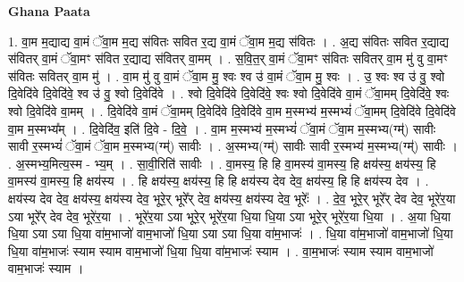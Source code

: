 \documentclass[17pt]{extarticle}
\begin{document}
\textbf{Ghana Paata } \newline

1. वा॒म म॒द्याद्य वा॒मं ॅवा॒म म॒द्य स॑वितः सवित र॒द्य वा॒मं ॅवा॒म म॒द्य स॑वितः । . अ॒द्य स॑वितः सवित र॒द्याद्य स॑वितर् वा॒मं ॅवा॒मꣳ स॑वित र॒द्याद्य स॑वितर् वा॒मम् । . स॒वि॒त॒र् वा॒मं ॅवा॒मꣳ स॑वितः सवितर् वा॒म मु॑ वु वा॒मꣳ स॑वितः सवितर् वा॒म मु॑ । . वा॒म मु॑ वु वा॒मं ॅवा॒म मु॒ श्वः श्व उ॑ वा॒मं ॅवा॒म मु॒ श्वः । . उ॒ श्वः श्व उ॑ वु॒ श्वो दि॒वेदि॑वे दि॒वेदि॑वे॒ श्व उ॑ वु॒ श्वो दि॒वेदि॑वे । . श्वो दि॒वेदि॑वे दि॒वेदि॑वे॒ श्वः श्वो दि॒वेदि॑वे वा॒मं ॅवा॒मम् दि॒वेदि॑वे॒ श्वः श्वो दि॒वेदि॑वे वा॒मम् । . दि॒वेदि॑वे वा॒मं ॅवा॒मम् दि॒वेदि॑वे दि॒वेदि॑वे वा॒म म॒स्मभ्य॑ म॒स्मभ्यं॑ ॅवा॒मम् दि॒वेदि॑वे दि॒वेदि॑वे वा॒म म॒स्मभ्य᳚म् । . दि॒वेदि॑व॒ इति॑ दि॒वे - दि॒वे॒ । . वा॒म म॒स्मभ्य॑ म॒स्मभ्यं॑ ॅवा॒मं ॅवा॒म म॒स्मभ्य(ग्म्॑) सावीः सावी र॒स्मभ्यं॑ ॅवा॒मं ॅवा॒म म॒स्मभ्य(ग्म्॑) सावीः । . अ॒स्मभ्य(ग्म्॑) सावीः सावी र॒स्मभ्य॑ म॒स्मभ्य(ग्म्॑) सावीः । . अ॒स्मभ्य॒मित्य॒स्म - भ्य॒म् । . सा॒वी॒रिति॑ सावीः । . वा॒मस्य॒ हि हि वा॒मस्य॑ वा॒मस्य॒ हि क्षय॑स्य॒ क्षय॑स्य॒ हि वा॒मस्य॑ वा॒मस्य॒ हि क्षय॑स्य । . हि क्षय॑स्य॒ क्षय॑स्य॒ हि हि क्षय॑स्य देव देव॒ क्षय॑स्य॒ हि हि क्षय॑स्य देव । . क्षय॑स्य देव देव॒ क्षय॑स्य॒ क्षय॑स्य देव॒ भूरे॒र् भूरे᳚र् देव॒ क्षय॑स्य॒ क्षय॑स्य देव॒ भूरेः᳚ । . दे॒व॒ भूरे॒र् भूरे᳚र् देव देव॒ भूरे॑र॒या ऽया भूरे᳚र् देव देव॒ भूरे॑र॒या । . भूरे॑र॒या ऽया भूरे॒र् भूरे॑र॒या धि॒या धि॒या ऽया भूरे॒र् भूरे॑र॒या धि॒या । . अ॒या धि॒या धि॒या ऽया ऽया धि॒या वा॑म॒भाजो॑ वाम॒भाजो॑ धि॒या ऽया ऽया धि॒या वा॑म॒भाजः॑ । . धि॒या वा॑म॒भाजो॑ वाम॒भाजो॑ धि॒या धि॒या वा॑म॒भाजः॑ स्याम स्याम वाम॒भाजो॑ धि॒या धि॒या वा॑म॒भाजः॑ स्याम । . वा॒म॒भाजः॑ स्याम स्याम वाम॒भाजो॑ वाम॒भाजः॑ स्याम । \newline
\end{document}
